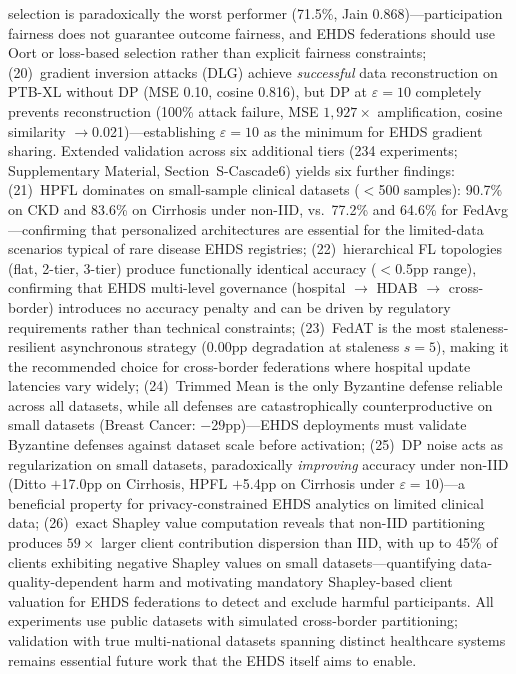 \documentclass[conference,a4paper]{IEEEtran}
\begin{document}
selection is paradoxically the worst performer (71.5\%, Jain 0.868)---participation fairness does not guarantee outcome fairness, and EHDS federations should use Oort or loss-based selection rather than explicit fairness constraints; (20)~gradient inversion attacks (DLG) achieve \textit{successful} data reconstruction on PTB-XL without DP (MSE 0.10, cosine 0.816), but DP at $\varepsilon{=}10$ completely prevents reconstruction (100\% attack failure, MSE $1{,}927\times$ amplification, cosine similarity $\to$0.021)---establishing $\varepsilon{=}10$ as the minimum for EHDS gradient sharing. Extended validation across six additional tiers (234 experiments; Supplementary Material, Section~S-Cascade6) yields six further findings: (21)~HPFL dominates on small-sample clinical datasets ($<$500 samples): 90.7\% on CKD and 83.6\% on Cirrhosis under non-IID, vs.\ 77.2\% and 64.6\% for FedAvg---confirming that personalized architectures are essential for the limited-data scenarios typical of rare disease EHDS registries; (22)~hierarchical FL topologies (flat, 2-tier, 3-tier) produce functionally identical accuracy ($<$0.5pp range), confirming that EHDS multi-level governance (hospital $\to$ HDAB $\to$ cross-border) introduces no accuracy penalty and can be driven by regulatory requirements rather than technical constraints; (23)~FedAT is the most staleness-resilient asynchronous strategy (0.00pp degradation at staleness $s{=}5$), making it the recommended choice for cross-border federations where hospital update latencies vary widely; (24)~Trimmed Mean is the only Byzantine defense reliable across all datasets, while all defenses are catastrophically counterproductive on small datasets (Breast Cancer: $-$29pp)---EHDS deployments must validate Byzantine defenses against dataset scale before activation; (25)~DP noise acts as regularization on small datasets, paradoxically \textit{improving} accuracy under non-IID (Ditto $+$17.0pp on Cirrhosis, HPFL $+$5.4pp on Cirrhosis under $\varepsilon{=}10$)---a beneficial property for privacy-constrained EHDS analytics on limited clinical data; (26)~exact Shapley value computation reveals that non-IID partitioning produces $59\times$ larger client contribution dispersion than IID, with up to 45\% of clients exhibiting negative Shapley values on small datasets---quantifying data-quality-dependent harm and motivating mandatory Shapley-based client valuation for EHDS federations to detect and exclude harmful participants. All experiments use public datasets with simulated cross-border partitioning; validation with true multi-national datasets spanning distinct healthcare systems remains essential future work that the EHDS itself aims to enable.
\end{document}
